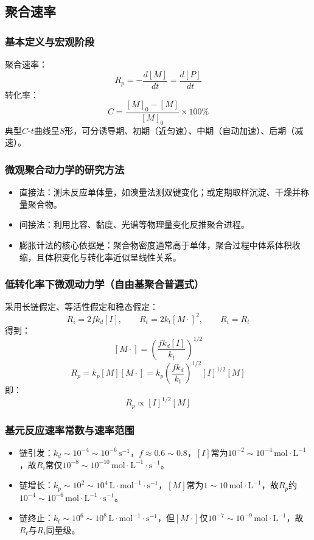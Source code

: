 ﻿\documentclass[12pt,a4paper]{article}
\begin{document}
\subsection{聚合速率}
\subsubsection{基本定义与宏观阶段}
聚合速率：
\[
R_p=-\frac{d[M]}{dt}=\frac{d[P]}{dt}
\]
转化率：
\[
C=\frac{[M]_0-[M]}{[M]_0}\times100\%
\]
典型$C$-$t$曲线呈$S$形，可分诱导期、初期（近匀速）、中期（自动加速）、后期（减速）。

\subsubsection{微观聚合动力学的研究方法}
\begin{itemize}
  \item 直接法：测未反应单体量，如溴量法测双键变化；或定期取样沉淀、干燥并称量聚合物。
  \item 间接法：利用比容、黏度、光谱等物理量变化反推聚合进程。
  \item 膨胀计法的核心依据是：聚合物密度通常高于单体，聚合过程中体系体积收缩，且体积变化与转化率近似呈线性关系。
\end{itemize}

\subsubsection{低转化率下微观动力学（自由基聚合普遍式）}
采用长链假定、等活性假定和稳态假定：
\[
R_i=2fk_d[I],\qquad R_t=2k_t[M\cdot]^2,\qquad R_i=R_t
\]
得到：
\[
[M\cdot]=\left(\frac{fk_d[I]}{k_t}\right)^{1/2}
\]
\[
R_p=k_p[M][M\cdot]=k_p\left(\frac{fk_d}{k_t}\right)^{1/2}[I]^{1/2}[M]
\]
即：
\[
R_p\propto [I]^{1/2}[M]
\]

\subsubsection{基元反应速率常数与速率范围}
\begin{itemize}
  \item 链引发：$k_d\sim10^{-4}\sim10^{-6}\,\mathrm{s^{-1}}$，$f\approx0.6\sim0.8$，$[I]$常为$10^{-2}\sim10^{-4}\,\mathrm{mol\cdot L^{-1}}$，故$R_i$常仅$10^{-8}\sim10^{-10}\,\mathrm{mol\cdot L^{-1}\cdot s^{-1}}$。
  \item 链增长：$k_p\sim10^2\sim10^4\,\mathrm{L\cdot mol^{-1}\cdot s^{-1}}$，$[M]$常为$1\sim10\,\mathrm{mol\cdot L^{-1}}$，故$R_p$约$10^{-4}\sim10^{-6}\,\mathrm{mol\cdot L^{-1}\cdot s^{-1}}$。
  \item 链终止：$k_t\sim10^6\sim10^8\,\mathrm{L\cdot mol^{-1}\cdot s^{-1}}$，但$[M\cdot]$仅$10^{-7}\sim10^{-9}\,\mathrm{mol\cdot L^{-1}}$，故$R_t$与$R_i$同量级。
\end{itemize}
\end{document}
